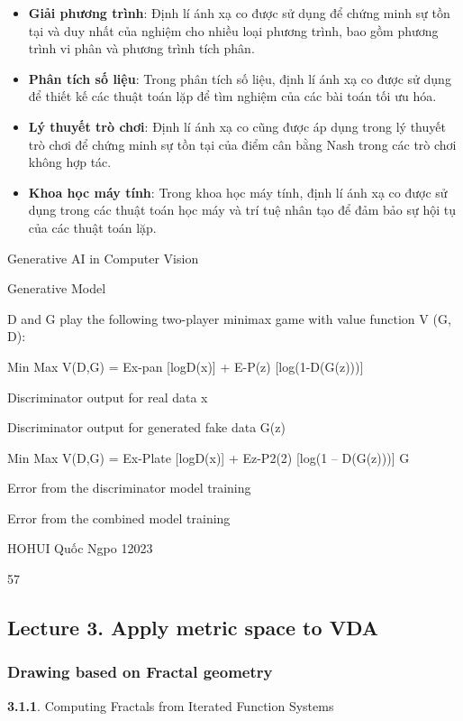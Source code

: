 \begin{itemize}
    \item \textbf{Giải phương trình}: Định lí ánh xạ co được sử dụng để chứng minh sự tồn tại và duy nhất của nghiệm cho nhiều loại phương trình, bao gồm phương trình vi phân và phương trình tích phân.
    \item \textbf{Phân tích số liệu}: Trong phân tích số liệu, định lí ánh xạ co được sử dụng để thiết kế các thuật toán lặp để tìm nghiệm của các bài toán tối ưu hóa.
    \item \textbf{Lý thuyết trò chơi}: Định lí ánh xạ co cũng được áp dụng trong lý thuyết trò chơi để chứng minh sự tồn tại của điểm cân bằng Nash trong các trò chơi không hợp tác.
    \item \textbf{Khoa học máy tính}: Trong khoa học máy tính, định lí ánh xạ co được sử dụng trong các thuật toán học máy và trí tuệ nhân tạo để đảm bảo sự hội tụ của các thuật toán lặp.
\end{itemize}













Generative AI in Computer Vision

Generative Model

D and G play the following two-player minimax game with value function V (G, D):

Min Max V(D,G) = Ex-pan [logD(x)] + E-P(z) [log(1-D(G(z)))]

Discriminator output for real data x

Discriminator output for generated fake data G(z)

Min Max V(D,G) = Ex-Plate [logD(x)] + Ez-P2(2) [log(1 – D(G(z)))] G

Error from the discriminator model training

Error from the combined model training

HOHUI Quốc Ngpo 12023

57





\pagebreak
\subsection{Lecture 3. Apply 
metric space to VDA}
\subsubsection {Drawing based on Fractal geometry}
\textbf{3.1.1}. Computing Fractals from Iterated Function Systems

